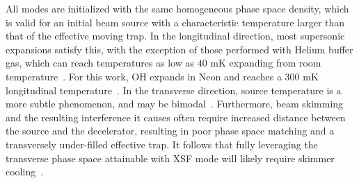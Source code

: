 \documentclass[%
 reprint,
 amsmath,amssymb,
 aps,
prl,
]{revtex4-1}
\begin{document}
All modes are initialized with the same homogeneous phase space density, which is valid for an initial beam source with a characteristic temperature larger than that of the effective moving trap.
In the longitudinal direction, most supersonic expansions satisfy this, with the exception of those performed with Helium buffer gas, which can reach temperatures as low as $40\text{ mK}$ expanding from room temperature~\cite{Even2014}.
For this work, OH expands in Neon and reaches a $300\text{ mK}$ longitudinal temperature~\cite{Wu2018}.
In the transverse direction, source temperature is a more subtle phenomenon, and may be bimodal~\cite{Beijerinck1981}.
Furthermore, beam skimming and the resulting interference it causes often require increased distance between the source and the decelerator, resulting in poor phase space matching and a transversely under-filled effective trap.
It follows that fully leveraging the transverse phase space attainable with XSF mode will likely require skimmer cooling~\cite{Wu2018}.



\end{document}
